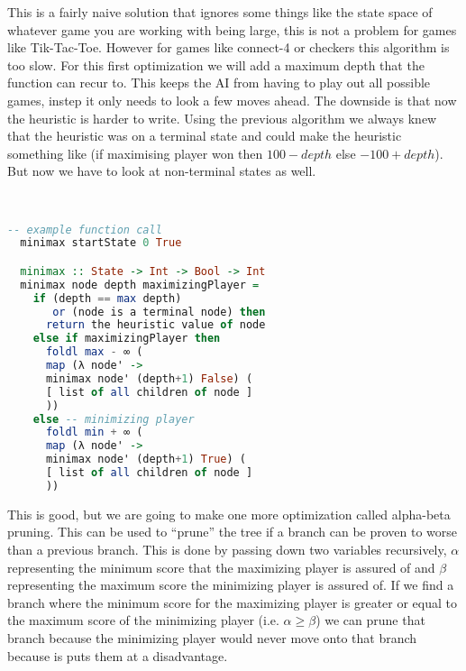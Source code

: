 \documentclass[12pt]{article}
\begin{document}
  \begin{paragraph}
    \qquad This is a fairly naive solution that ignores some things like the state space of whatever game you are working with being large, this is not a problem for games like Tik-Tac-Toe. However for games like connect-4 or checkers this algorithm is too slow. For this first optimization we will add a maximum depth that the function can recur to. This keeps the AI from having to play out all possible games, instep it only needs to look a few moves ahead. The downside is that now the heuristic is harder to write. Using the previous algorithm we always knew that the heuristic was on a terminal state and could make the heuristic something like (if maximising player won then $100-depth$ else $-100+depth$). But now we have to look at non-terminal states as well.
  \end{paragraph}\\

  \begin{footnotesize} 
  \begin{lstlisting}[language=Haskell]
  -- example function call
  minimax startState 0 True

  minimax :: State -> Int -> Bool -> Int
  minimax node depth maximizingPlayer =
    if (depth == max depth) 
       or (node is a terminal node) then
      return the heuristic value of node
    else if maximizingPlayer then
      foldl max - ∞ (
      map (λ node' -> 
      minimax node' (depth+1) False) (
      [ list of all children of node ]
      ))
    else -- minimizing player 
      foldl min + ∞ (
      map (λ node' -> 
      minimax node' (depth+1) True) (
      [ list of all children of node ]
      ))
  \end{lstlisting}
  \end{footnotesize} 

  \begin{paragraph}
    \qquad This is good, but we are going to make one more optimization called alpha-beta pruning\textsuperscript{\cite{AlphaBeta}}. This can be used to ``prune'' the tree if a branch can be proven to worse than a previous branch. This is done by passing down two variables recursively, $\alpha$ representing the minimum score that the maximizing player is assured of and $\beta$ representing the maximum score the minimizing player is assured of. If we find a branch where the minimum score for the maximizing player is greater or equal to the maximum score of the minimizing player (i.e. $\alpha\geq\beta$) we can prune that branch because the minimizing player would never move onto that branch because is puts them at a disadvantage.
  \end{paragraph}\\
\end{document}
